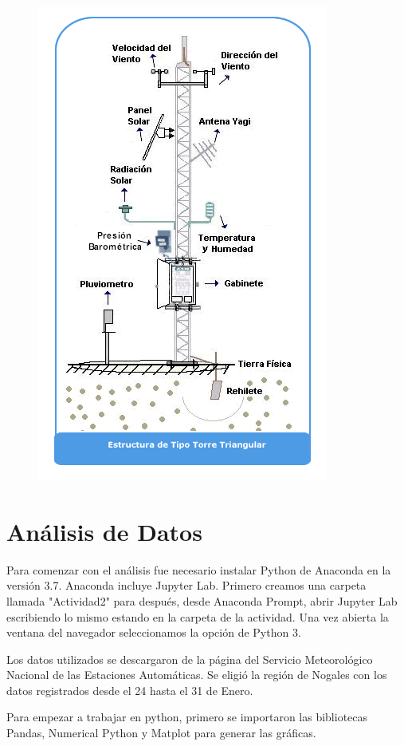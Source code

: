 \documentclass{article}
\begin{document}
\begin{figure}[h]
    \centering
    \includegraphics[scale = 0.42]{Estacion2.png}
\end{figure}

\section{Análisis de Datos}

Para comenzar con el análisis fue necesario instalar Python de Anaconda en la versión 3.7. Anaconda incluye Jupyter Lab. Primero creamos una carpeta llamada "Actividad2" para después, desde Anaconda Prompt, abrir Jupyter Lab escribiendo lo mismo estando en la carpeta de la actividad. Una vez abierta la ventana del navegador seleccionamos la opción de Python 3.

Los datos utilizados se descargaron de la página del Servicio Meteorológico Nacional de las Estaciones Automáticas. Se eligió la región de Nogales con los datos registrados desde el 24 hasta el 31 de Enero.

Para empezar a trabajar en python, primero se importaron las bibliotecas Pandas, Numerical Python y Matplot para generar las gráficas.
\end{document}
